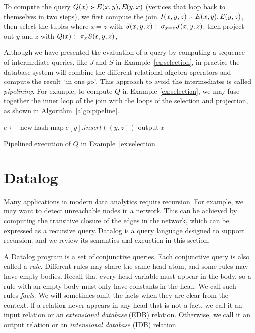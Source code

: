 \begin{ex}
\label{ex:selection}
To compute the query $Q(x) \text{ :- } E(x, y), E(y, x)$ 
 (vertices that loop back to themselves in two steps),
 we first compute the join $J(x, y, z) \text{ :- } E(x, y), E(y, z)$, 
 then select the tuples where $x = z$ with $S(x, y, z) \text{ :- } \sigma_{x=z} J(x, y, z)$.
 then project out $y$ and $z$ with $Q(x) \text{ :- } \pi_{x} S(x, y, z)$,
\end{ex}
 
Although we have presented the evaluation of a query 
 by computing a sequence of intermediate queries, 
 like $J$ and $S$ in Example~\ref{ex:selection},
 in practice the database system will combine
 the different relational algebra operators 
 and compute the result ``in one go''.
This approach to avoid the intermediates 
 is called {\em pipelining}.
For example, to compute $Q$ in Example~\ref{ex:selection},
 we may fuse together the inner loop of the join
 with the loops of the selection and projection, 
 as shown in Algorithm~\ref{algo:pipeline}.

\begin{algorithm}
$e \gets $ new hash map \;
{
    $e[y].insert((y, z))$\;
}
{
    {
        {
            output $x$\;
        }
    }
}
\caption{Pipelined execution of $Q$ in Example~\ref{ex:selection}.}
\label{algo:pipeline} 
\end{algorithm}

\section{Datalog}
\label{sec:datalog}

Many applications in modern data analytics require recursion.
For example, we may want to detect unreachable nodes in a network.
This can be achieved by computing the transitive closure 
 of the edges in the network,
 which can be expressed as a recursive query.
Datalog is a query language designed to support recursion, 
 and we review its semantics and exeuction in this section.

A Datalog program is a set of conjunctive queries.
Each conjunctive query is also called a {\em rule}.
Different rules may share the same head atom, 
 and some rules may have empty bodies.
Recall that every head variable must appear in the body,
 so a rule with an empty body must only have constants in the head.
We call such rules {\em facts}.
We will sometimes omit the facts when they are clear from the context.
If a relation never appears in any head that is not a fact,
 we call it an input relation or an {\em extensional database} (EDB) relation.
Otherwise, we call it an output relation or an {\em intensional database} (IDB) relation.

